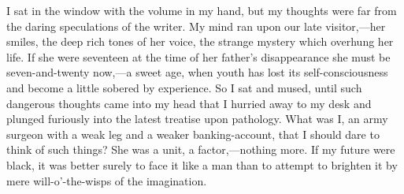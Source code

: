 I sat in the window with the volume in my hand, but my thoughts were far from the daring speculations of the writer. My mind ran upon our late visitor,—her smiles, the deep rich tones of her voice, the strange mystery which overhung her life. If she were seventeen at the time of her father's disappearance she must be seven-and-twenty now,—a sweet age, when youth has lost its self-consciousness and become a little sobered by experience. So I sat and mused, until such dangerous thoughts came into my head that I hurried away to my desk and plunged furiously into the latest treatise upon pathology. What was I, an army surgeon with a weak leg and a weaker banking-account, that I should dare to think of such things? She was a unit, a factor,—nothing more. If my future were black, it was better surely to face it like a man than to attempt to brighten it by mere will-o'-the-wisps of the imagination.